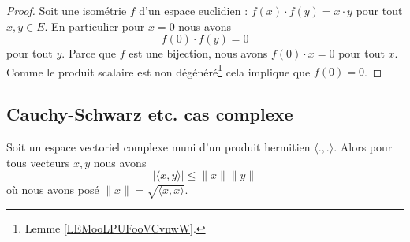 \begin{proof}
    Soit une isométrie \( f\) d'un espace euclidien : \( f(x)\cdot f(y)=x\cdot y\) pour tout \( x,y\in E\). En particulier pour \( x=0\) nous avons
    \begin{equation}
        f(0)\cdot f(y)=0
    \end{equation}
    pour tout \( y\). Parce que \( f\) est une bijection, nous avons \( f(0)\cdot x=0\) pour tout \( x\). Comme le produit scalaire est non dégénéré\footnote{Lemme \ref{LEMooLPUFooVCvnwW}.} cela implique que \( f(0)=0\).
\end{proof}

\subsection{Cauchy-Schwarz etc. cas complexe}

\begin{theorem}      \label{THOooSUCBooFnpkaF}
     Soit un espace vectoriel complexe muni d'un produit hermitien \( \langle ., .\rangle \). Alors pour tous vecteurs \( x,y\) nous avons
     \begin{equation}
         | \langle x, y\rangle  |\leq \| x \|\| y \|
     \end{equation}
     où nous avons posé \( \| x \|=\sqrt{ \langle x, x\rangle  }\).
\end{theorem}

